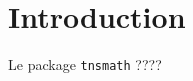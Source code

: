 \documentclass[12pt,a4paper]{article}
\begin{document}
\section{Introduction}

Le package \verb#tnsmath# ????
\end{document}
